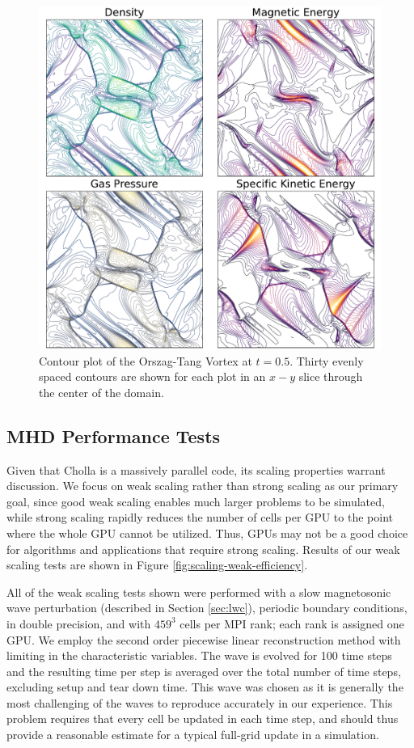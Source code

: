 \begin{figure}[!ht]
    \includegraphics[width=\linewidth]{assets/3-mhd-tests/orszag-tang-vortex.pdf}
    \caption{Contour plot of the Orszag-Tang Vortex at $t=0.5$. Thirty evenly spaced contours are shown for each plot in an $x-y$ slice through the center of the domain.  }
    \label{fig:otv}
\end{figure}

\subsection{MHD Performance Tests}
\label{sec:mhd-perf-tests}

Given that Cholla is a massively parallel code, its scaling properties warrant discussion. We focus on weak scaling rather than strong scaling as our primary goal, since good weak scaling enables much larger problems to be simulated, while strong scaling rapidly reduces the number of cells per GPU to the point where the whole GPU cannot be utilized. Thus, GPUs may not be a good choice for algorithms and applications that require strong scaling. Results of our weak scaling tests are shown in Figure \ref{fig:scaling-weak-efficiency}. 

All of the weak scaling tests shown were performed with a slow magnetosonic wave perturbation (described in Section \ref{sec:lwc}), periodic boundary conditions, in double precision, and with $459^3$ cells per MPI rank; each rank is assigned one GPU. We employ the second order piecewise linear reconstruction method with limiting in the characteristic variables. The wave is evolved for 100 time steps and the resulting time per step is averaged over the total number of time steps, excluding setup and tear down time. This wave was chosen as it is generally the most challenging of the waves to reproduce accurately in our experience. This problem requires that every cell be updated in each time step, and should thus provide a reasonable estimate for a typical full-grid update in a simulation.

